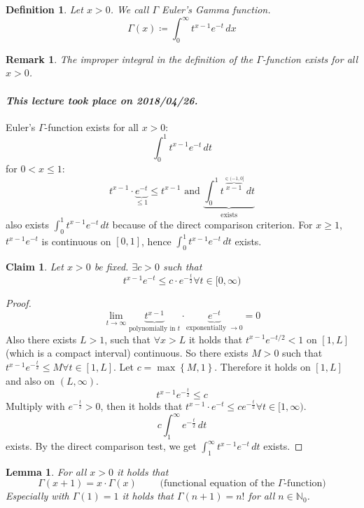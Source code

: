 \documentclass{article}
\newtheorem{definition}{Definition}  \numberwithin{definition}{section}
\newtheorem{lemma}{Lemma}  \numberwithin{lemma}{section}
\newtheorem*{claim}{Claim}%
\newtheorem{remark}{Remark}  \numberwithin{remark}{section}
\newcommand{\set}[1]{\left\{#1\right\}}
\newcommand{\dateref}[1]{\paragraph{\textit{This lecture took place on #1.}}}
\begin{document}
\begin{definition} %
  Let $x > 0$.
  We call $\Gamma$ \emph{Euler's Gamma function}.
  \[ \Gamma(x) \coloneqq \int_0^\infty t^{x - 1} e^{-t} \, dx \]
\end{definition}

\begin{remark}
  The improper integral in the definition of the $\Gamma$-function exists for all $x > 0$.
\end{remark}

\dateref{2018/04/26}

Euler's $\Gamma$-function exists for all $x > 0$:
\[ \int_0^1 t^{x-1} e^{-t} \,dt \]
for $0 < x \leq 1$:
\[ t^{x-1} \cdot \underbrace{e^{-t}}_{\leq 1} \leq t^{x-1} \text{ and } \underbrace{\int_0^1 t^{\overbrace{x-1}^{\in (-1,0]}} \, dt}_{\text{exists}} \]
also exists $\int_0^1 t^{x-1} e^{-t} \, dt$ because of the direct comparison criterion.
For $x \geq 1$, $t^{x-1} e^{-t}$ is continuous on $[0,1]$, hence $\int_0^1 t^{x-1} e^{-t} \, dt$ exists.

\begin{claim}
  Let $x > 0$ be fixed. $\exists c > 0$ such that
  \[ t^{x-1} e^{-t} \leq c \cdot e^{-\frac t2} \forall t \in [0,\infty) \]
\end{claim}

\begin{proof}
  \[ \lim_{t\to\infty} \underbrace{t^{x-1}}_{\text{polynomially in } t} \cdot \underbrace{e^{-t}}_{\text{exponentially } \to 0} = 0 \]
  Also there exists $L > 1$, such that $\forall x > L$ it holds that $t^{x-1} e^{-t/2} < 1$ on $[1,L]$ (which is a compact interval) continuous.
  So there exists $M > 0$ such that $t^{x-1} e^{-\frac t2} \leq M \forall t \in [1,L]$.
  Let $c = \max\set{M, 1}$. Therefore it holds on $[1,L]$ and also on $(L,\infty)$.
  \[ t^{x-1} e^{-\frac t2} \leq c \]
  Multiply with $e^{-\frac t2} > 0$, then it holds that $t^{x-1} \cdot e^{-t} \leq ce^{-\frac t2} \forall t \in [1,\infty)$.
  \[ c \int_1^\infty e^{-\frac t2} \, dt \]
  exists.
  By the direct comparison test, we get $\int_1^\infty t^{x-1} e^{-t} \, dt$ exists.
\end{proof}

\begin{lemma} %
  \label{lemma13}
  For all $x > 0$ it holds that
  \[ \Gamma(x + 1) = x \cdot \Gamma(x) \qquad \text{ (functional equation of the $\Gamma$-function)} \]
  Especially with $\Gamma(1) = 1$ it holds that $\Gamma(n+1) = n!$ for all $n \in \mathbb N_0$.
\end{lemma}
\end{document}
